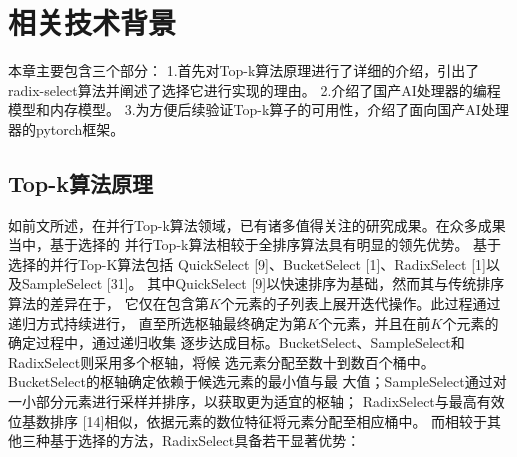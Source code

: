 \chapter{相关技术背景}
本章主要包含三个部分：
1.首先对Top-k算法原理进行了详细的介绍，引出了radix-select算法并阐述了选择它进行实现的理由。
2.介绍了国产AI处理器的编程模型和内存模型。
3.为方便后续验证Top-k算子的可用性，介绍了面向国产AI处理器的pytorch框架。
\section{Top-k算法原理}

如前文所述，在并行Top-k算法领域，已有诸多值得关注的研究成果。在众多成果当中，基于选择的
并行Top-k算法相较于全排序算法具有明显的领先优势。
基于选择的并行Top-K算法包括
QuickSelect [9]、BucketSelect [1]、RadixSelect [1]以及SampleSelect [31]。
其中QuickSelect [9]以快速排序为基础，然而其与传统排序算法的差异在于，
它仅在包含第$K$个元素的子列表上展开迭代操作。此过程通过递归方式持续进行，
直至所选枢轴最终确定为第$K$个元素，并且在前$K$个元素的确定过程中，通过递归收集
逐步达成目标。BucketSelect、SampleSelect和RadixSelect则采用多个枢轴，将候
选元素分配至数十到数百个桶中。BucketSelect的枢轴确定依赖于候选元素的最小值与最
大值；SampleSelect通过对一小部分元素进行采样并排序，以获取更为适宜的枢轴；
RadixSelect与最高有效位基数排序 [14]相似，依据元素的数位特征将元素分配至相应桶中。
而相较于其他三种基于选择的方法，RadixSelect具备若干显著优势：

